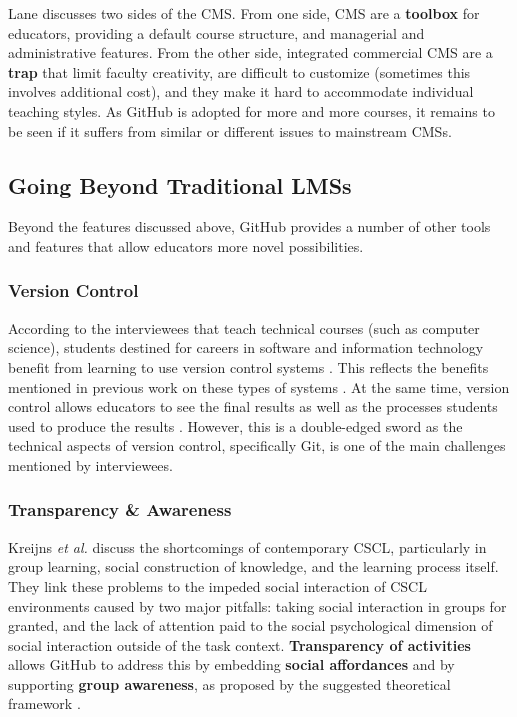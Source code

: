 Lane \cite{lane2008toolbox} discusses two sides of the CMS. From one side, CMS are a \textbf{toolbox} for educators, providing a default course structure, and managerial and administrative features. From the other side, integrated commercial CMS are a \textbf{trap} that limit faculty creativity, are difficult to customize (sometimes this involves additional cost), and they make it hard to accommodate individual teaching styles. As GitHub is adopted for more and more courses, it remains to be seen if it suffers from similar or different issues to mainstream CMSs.

\subsection{Going Beyond Traditional LMSs}
Beyond the features discussed above, GitHub provides a number of other tools and features that allow educators more novel possibilities.

\subsubsection{Version Control}
According to the interviewees that teach technical courses (such as computer science), students destined for careers in software and information technology benefit from learning to use version control systems \cite{britton2013using}. This reflects the benefits mentioned in previous work on these types of systems \cite{reid2005learning}. At the same time, version control allows educators to see the final results as well as the processes students used to produce the results \cite{glassy2006using}. However, this is a double-edged sword as the technical aspects of version control, specifically Git, is one of the main challenges mentioned by interviewees.


\subsubsection{Transparency \& Awareness}
Kreijns \textit{et al.} \cite{kreijns2013social} discuss the shortcomings of contemporary CSCL, particularly in group learning, social construction of knowledge, and the learning process itself. They link these problems to the impeded social interaction of CSCL environments caused by two major pitfalls: taking social interaction in groups for granted, and the lack of attention paid to the social psychological dimension of social interaction outside of the task context. \textbf{Transparency of activities} allows GitHub to address this by embedding \textbf{social affordances} and by supporting \textbf{group awareness}, as proposed by the suggested theoretical framework \cite{kreijns2002sociability}.

